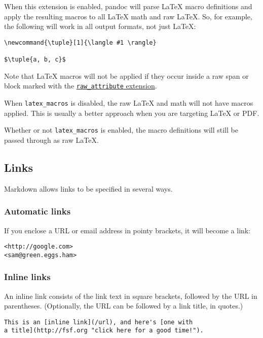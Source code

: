When this extension is enabled, pandoc will parse LaTeX macro
definitions and apply the resulting macros to all LaTeX math and raw
LaTeX. So, for example, the following will work in all output formats,
not just LaTeX:

\begin{verbatim}
\newcommand{\tuple}[1]{\langle #1 \rangle}

$\tuple{a, b, c}$
\end{verbatim}

Note that LaTeX macros will not be applied if they occur inside a raw
span or block marked with the
\protect\hyperlink{extension-raw_attribute}{\texttt{raw\_attribute}
extension}.

When \texttt{latex\_macros} is disabled, the raw LaTeX and math will not
have macros applied. This is usually a better approach when you are
targeting LaTeX or PDF.

Whether or not \texttt{latex\_macros} is enabled, the macro definitions
will still be passed through as raw LaTeX.

\hypertarget{links-1}{%
\subsection{Links}\label{links-1}}

Markdown allows links to be specified in several ways.

\hypertarget{automatic-links}{%
\subsubsection{Automatic links}\label{automatic-links}}

If you enclose a URL or email address in pointy brackets, it will become
a link:

\begin{verbatim}
<http://google.com>
<sam@green.eggs.ham>
\end{verbatim}

\hypertarget{inline-links}{%
\subsubsection{Inline links}\label{inline-links}}

An inline link consists of the link text in square brackets, followed by
the URL in parentheses. (Optionally, the URL can be followed by a link
title, in quotes.)

\begin{verbatim}
This is an [inline link](/url), and here's [one with
a title](http://fsf.org "click here for a good time!").
\end{verbatim}

